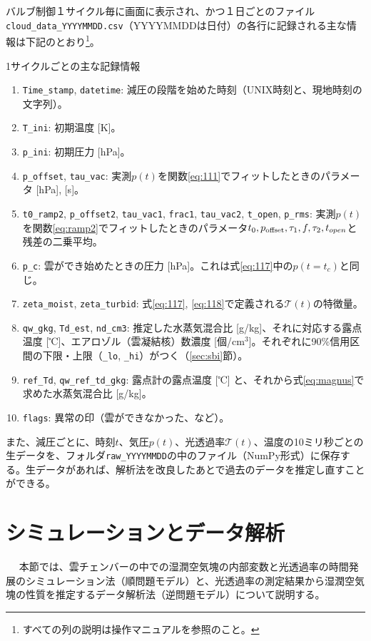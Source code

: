 \documentclass{ltjsarticle}
\begin{document}
バルブ制御１サイクル毎に画面に表示され、かつ１日ごとのファイル\verb|cloud_data_YYYYMMDD.csv|（YYYYMMDDは日付）の各行に記録される主な情報は下記のとおり\footnote{すべての列の説明は操作マニュアルを参照のこと。}。
\\
\begin{itembox}[l]{1サイクルごとの主な記録情報}
\begin{enumerate}
\item \verb|Time_stamp|, \verb|datetime|: 減圧の段階を始めた時刻（UNIX時刻と、現地時刻の文字列）。
\item \verb|T_ini|: 初期温度 [K]。
\item \verb|p_ini|: 初期圧力 [hPa]。
\item \verb|p_offset|, \verb|tau_vac|: 実測$p(t)$を関数\eqref{eq:111}でフィットしたときのパラメータ [hPa], [s]。
\item \verb|t0_ramp2|, \verb|p_offset2|, \verb|tau_vac1|, \verb|frac1|, \verb|tau_vac2|, \verb|t_open|, \verb|p_rms|: 実測$p(t)$を関数\eqref{eq:ramp2}でフィットしたときのパラメータ$t_{0}, p_{\rm offset}, \tau_{1}, f, \tau_{2}, t_{open}$と残差の二乗平均。
\item \verb|p_c|: 雲ができ始めたときの圧力 [hPa]。これは式\eqref{eq:117}中の$p(t=t_{c})$と同じ。
\item \verb|zeta_moist|, \verb|zeta_turbid|: 式\eqref{eq:117}, \eqref{eq:118}で定義される$\mathcal{T}(t)$の特徴量。
\item \verb|qw_gkg|, \verb|Td_est|, \verb|nd_cm3|: 推定した水蒸気混合比 [g/kg]、それに対応する露点温度 [℃]、エアロゾル（雲凝結核）数濃度 [個/cm$^{3}$]。それぞれに90\%信用区間の下限・上限（\verb|_lo|, \verb|_hi|）がつく（\ref{sec:sbi}節）。
\item \verb|ref_Td|, \verb|qw_ref_td_gkg|: 露点計の露点温度 [℃] と、それから式\eqref{eq:magnus}で求めた水蒸気混合比 [g/kg]。
\item \verb|flags|: 異常の印（雲ができなかった、など）。
\end{enumerate}
\end{itembox}
また、減圧ごとに、時刻$t$、気圧$p(t)$、光透過率$\mathcal{T}(t)$、温度の10ミリ秒ごとの生データを、フォルダ\verb|raw_YYYYMMDD|の中のファイル（NumPy形式）に保存する。生データがあれば、解析法を改良したあとで過去のデータを推定し直すことができる。


\section{シミュレーションとデータ解析}　
本節では、雲チェンバーの中での湿潤空気塊の内部変数と光透過率の時間発展のシミュレーション法（順問題モデル）と、光透過率の測定結果から湿潤空気塊の性質を推定するデータ解析法（逆問題モデル）について説明する。
\end{document}
